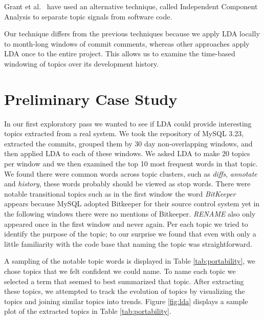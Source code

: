 \documentclass[times, 10pt,twocolumn]{article}
\newcommand{\shrinkit}{\vspace*{-.3em}}
\begin{document}
Grant et al.~\cite{scottcordy} have used an alternative technique,
 called Independent Component Analysis to
separate topic signals from software code. 

Our technique differs from the previous techniques because we apply
LDA locally to month-long windows of commit comments, whereas other
approaches apply LDA once to the entire project. This allows us to
examine the time-based windowing of topics over its development
history.



\shrinkit
\section{Preliminary Case Study}
\shrinkit

In our first exploratory pass we wanted to see if LDA could provide
interesting topics extracted from a real system. We took the
repository of MySQL 3.23, extracted the commits, grouped them by 30
day non-overlapping windows, and then applied LDA to each of these
windows. We asked LDA to make 20 topics per window and we then
 examined the top 10 most frequent words in that topic.  We
found there were common words across topic clusters, such as
\emph{diffs}, \emph{annotate} and \emph{history}, these words probably should
be viewed as stop words. There were notable transitional topics such
as in the first window the word \emph{BitKeeper} appears because MySQL
adopted Bitkeeper for their source control system yet in the following
windows there were no mentions of Bitkeeper. \emph{RENAME} also only
appeared once in the first window and never again. Per each topic we
tried to identify the purpose of the topic; to our surprise we found
that even with only a little familiarity with the code base that
naming the topic was straightforward.

A sampling of the notable topic words is displayed in Table
\ref{tab:portability}, we chose topics that we felt confident we could
name.  To name each topic we selected a term that seemed to best
summarized that topic.  After extracting these topics, we attempted to
track the evolution of topics by visualizing the topics and joining
similar topics into trends.  Figure \ref{fig:lda} displays a sample
plot of the extracted topics in Table \ref{tab:portability}.
\end{document}
